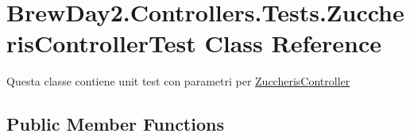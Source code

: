 \hypertarget{class_brew_day2_1_1_controllers_1_1_tests_1_1_zuccheris_controller_test}{}\section{Brew\+Day2.\+Controllers.\+Tests.\+Zuccheris\+Controller\+Test Class Reference}
\label{class_brew_day2_1_1_controllers_1_1_tests_1_1_zuccheris_controller_test}


Questa classe contiene unit test con parametri per \mbox{\hyperlink{class_brew_day2_1_1_controllers_1_1_zuccheris_controller}{Zuccheris\+Controller}} 


\subsection*{Public Member Functions}
